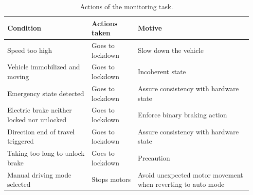 \documentclass[journal]{IEEEtran}
\begin{document}

\begin{table}[!t]

    \renewcommand{\arraystretch}{1.3}
        \caption{Actions of the monitoring task.}
        \label{tab:acoes_monitor_system}
        \centering
        \begin{tabular}{@{} m{} m{} m{}  @{}}
            \hline
            Condition & Actions taken & Motive\\
            \hline
            Speed too high & Goes to lockdown & Slow down the vehicle\\
            Vehicle immobilized and moving \footnotemark[3] & Goes to lockdown & Incoherent state\\
            Emergency state detected \footnotemark[5] & Goes to lockdown & Assure consistency with hardware state\\
            Electric brake neither locked nor unlocked & Goes to lockdown & Enforce binary braking action\\
            Direction end of travel triggered & Goes to lockdown & Assure consistency with hardware state\\
            Taking too long to unlock brake & Goes to lockdown & Precaution \\
            Manual driving mode selected & Stops motors & Avoid unexpected motor movement when reverting to auto mode\\
            \hline
        \end{tabular}

\end{table}

\end{document}
